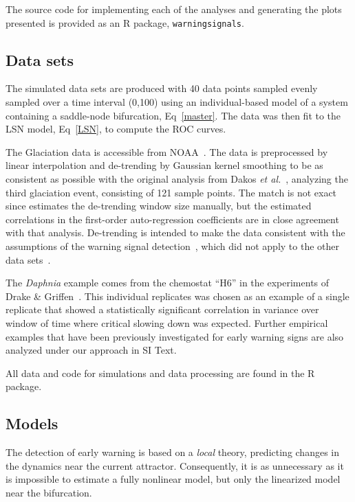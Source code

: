 \documentclass{pnastwo}
\begin{document}
\begin{article}
\begin{materials}
The source code for implementing each of the analyses and generating the plots presented is provided as an R package, \verb|warningsignals|. 


                               \subsection{Data sets}
The simulated data sets are produced with 40 data points
sampled evenly sampled over a time interval (0,100) using an individual-based model of a system containing a saddle-node bifurcation, Eq~\eqref{master}.
The data was then fit to the LSN model, Eq~\eqref{LSN}, to compute the ROC curves. 

The Glaciation data is accessible from NOAA~\cite{Petit1999}.
The data is preprocessed by linear interpolation and de-trending by Gaussian kernel smoothing 
to be as consistent as possible with the original analysis from Dakos \emph{et al.}~\cite{Dakos2008},
analyzing the third glaciation event, consisting of 121 sample points. 
The match is not exact since estimates the de-trending window size manually,
but the estimated correlations in the first-order auto-regression coefficients are in close agreement with that analysis. 
De-trending is intended to make the data consistent with the assumptions of the warning signal detection~\cite{Dakos2008}, 
which did not apply to the other data sets~\cite{Drake2010}.  

The \emph{Daphnia} example comes from the chemostat ``H6'' in the experiments of Drake \& Griffen~\cite{Drake2010}. 
This individual replicates was chosen as an example of a single replicate 
that showed a statistically significant correlation in variance over window of time where critical slowing down was expected. 
Further empirical examples that have been previously investigated for early warning signs are also analyzed under our approach in SI Text.  

All data and code for simulations and data processing are found in the R package.  

                             \end{materials}

                             \appendix 
                             \subsection{Models}
The detection of early warning is based on a \emph{local} theory,
predicting changes in the dynamics near the current attractor.
Consequently, it is as unnecessary as it is impossible to estimate a fully nonlinear model,
but only the linearized model near the bifurcation.


\end{article}
\end{document}
